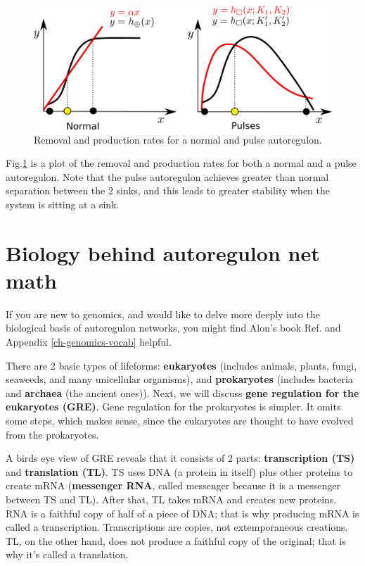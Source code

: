 \begin{figure}[h!]
\centering
\includegraphics[width=4.7in]
{autoregulons/pulse-removal-production.png}
\caption{Removal and production rates for
a normal and pulse autoregulon.}
\label{fig-pulse-removal-production}
\end{figure}
Fig.\ref{fig-pulse-removal-production}
is a plot of the removal and production rates for both
a normal and a pulse autoregulon. Note
that the pulse autoregulon
achieves greater
than normal separation
between the 2 sinks, 
and this leads to greater stability 
when the system is sitting at a sink.



\section{Biology behind autoregulon net math}
\label{sec-bio-basis-ar}

If you are new to genomics, and would like to delve more deeply into the biological
basis of autoregulon networks, you might find
Alon's book Ref.\cite{alon-book} and Appendix \ref{ch-genomics-vocab} helpful.

There are 2 basic types of lifeforms: {\bf eukaryotes} (includes animals, plants, fungi, seaweeds, and many unicellular organisms), and {\bf prokaryotes} (includes bacteria and {\bf archaea} (the ancient ones)). Next,
we will discuss {\bf gene regulation 
for the eukaryotes (GRE)}.
Gene regulation for the   
prokaryotes is
simpler. It omits some steps,
which makes sense, since the eukaryotes are thought 
to have evolved from the
prokaryotes.

A birds eye view of GRE
reveals that it consists of 2 parts: {\bf transcription (TS)} and 
{\bf translation (TL)}. 
TS uses DNA (a protein in itself) plus other proteins to create mRNA ({\bf messenger RNA}, called messenger because it is a messenger between TS and TL). After that,
TL takes mRNA and creates 
new proteins.
RNA is a faithful copy of half
of a piece of DNA; that is why 
producing 
mRNA is called a transcription. Transcriptions are copies, not extemporaneous creations. TL, on the other 
hand, does not produce a faithful copy of the original; that is why it's called a translation.

